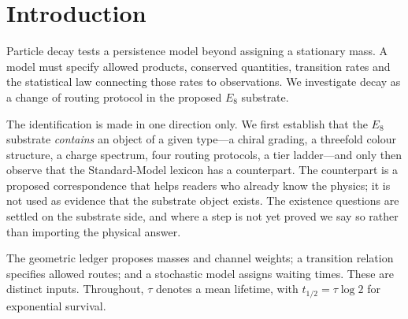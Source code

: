 \section{Introduction}
Particle decay tests a persistence model beyond assigning a stationary mass. A model must specify allowed products, conserved quantities, transition rates and the statistical law connecting those rates to observations. We investigate decay as a change of routing protocol in the proposed $E_8$ substrate.

The identification is made in one direction only. We first establish that the $E_8$ substrate \emph{contains} an object of a given type---a chiral grading, a threefold colour structure, a charge spectrum, four routing protocols, a tier ladder---and only then observe that the Standard-Model lexicon has a counterpart. The counterpart is a proposed correspondence that helps readers who already know the physics; it is not used as evidence that the substrate object exists. The existence questions are settled on the substrate side, and where a step is not yet proved we say so rather than importing the physical answer.

The geometric ledger proposes masses and channel weights; a transition relation specifies allowed routes; and a stochastic model assigns waiting times. These are distinct inputs. Throughout, $\tau$ denotes a mean lifetime, with $t_{1/2}=\tau\log 2$ for exponential survival.
